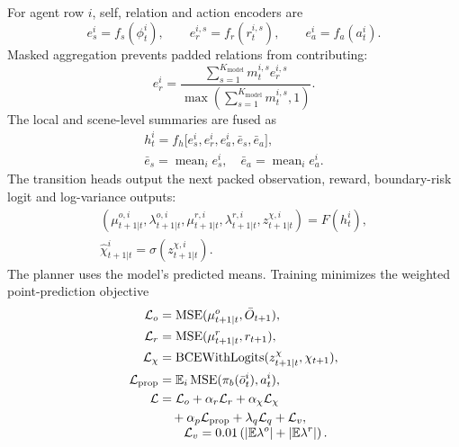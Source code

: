 \documentclass[journal]{IEEEtran}
\begin{document}
For agent row $i$, self, relation and action encoders are
\begin{equation}
 e_s^i=f_s(\phi_t^i),\qquad e_r^{i,s}=f_r(r_t^{i,s}),\qquad e_a^i=f_a(a_t^i).
\end{equation}
Masked aggregation prevents padded relations from contributing:
\begin{equation}
 e_r^i=\frac{\sum_{s=1}^{K_{\mathrm{model}}}m_t^{i,s}e_r^{i,s}}{\max(\sum_{s=1}^{K_{\mathrm{model}}}m_t^{i,s},1)}.
\label{eq:masked_aggregation}
\end{equation}
The local and scene-level summaries are fused as
\begin{equation}
\begin{gathered}
 h_t^i=f_h\bigl[e_s^i,e_r^i,e_a^i,\bar e_s,\bar e_a\bigr],\\
 \bar e_s=\operatorname{mean}_i e_s^i,\quad \bar e_a=\operatorname{mean}_i e_a^i.
\end{gathered}
\end{equation}
The transition heads output the next packed observation, reward, boundary-risk
logit and log-variance outputs:
\begin{equation}
\begin{gathered}
 (\mu_{t+1|t}^{o,i},\lambda_{t+1|t}^{o,i},\mu_{t+1|t}^{r,i},\lambda_{t+1|t}^{r,i},z_{t+1|t}^{\chi,i})=F(h_t^i),\\
 \hat\chi_{t+1|t}^i=\sigma(z_{t+1|t}^{\chi,i}).
\end{gathered}
\label{eq:transition_heads}
\end{equation}
The planner uses the model's predicted means. Training minimizes the
weighted point-prediction objective
\begin{equation}
\begin{aligned}
 \mathcal L_o&=\operatorname{MSE}(\mu^{o}_{t+1|t},\bar O_{t+1}),\\
 \mathcal L_r&=\operatorname{MSE}(\mu^{r}_{t+1|t},r_{t+1}),\\
 \mathcal L_\chi&=\operatorname{BCEWithLogits}(z_{t+1|t}^{\chi},\chi_{t+1}),\\
 \mathcal L_{\rm prop}&=\mathbb E_i\operatorname{MSE}(\pi_b(\bar o_t^i),a_t^i),\\
 \mathcal L&=\mathcal L_o+\alpha_r\mathcal L_r+\alpha_\chi\mathcal L_\chi\\
 &\quad+\alpha_p\mathcal L_{\rm prop}+\lambda_q\mathcal L_q
 +\mathcal L_v,
 \\[-1mm]
 &\qquad \mathcal L_v=0.01\left(|\mathbb E\lambda^o|+|\mathbb E\lambda^r|\right).
\end{aligned}
\label{eq:training_objective}
\end{equation}
\end{document}
